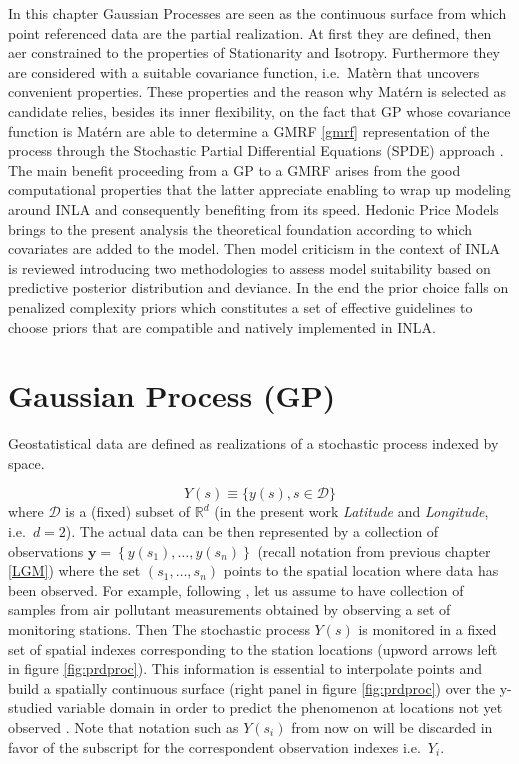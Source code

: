 \documentclass[
  12pt,
  a4paper,
  oneside]{book}
\theoremstyle{definition}
\theoremstyle{definition}
\theoremstyle{definition}
\theoremstyle{remark}
\begin{document}
In this chapter Gaussian Processes are seen as the continuous surface from which point referenced data are the partial realization. At first they are defined, then aer constrained to the properties of Stationarity and Isotropy. Furthermore they are considered with a suitable covariance function, i.e.~Matèrn that uncovers convenient properties. These properties and the reason why Matérn is selected as candidate relies, besides its inner flexibility, on the fact that GP whose covariance function is Matérn are able to determine a GMRF \ref{gmrf} representation of the process through the Stochastic Partial Differential Equations (SPDE) approach \citep{Lindgren2011}. The main benefit proceeding from a GP to a GMRF arises from the good computational properties that the latter appreciate enabling to wrap up modeling around INLA and consequently benefiting from its speed. Hedonic Price Models brings to the present analysis the theoretical foundation according to which covariates are added to the model. Then model criticism in the context of INLA is reviewed introducing two methodologies to assess model suitability based on predictive posterior distribution and deviance. In the end the prior choice falls on penalized complexity priors \citep{simpson2017} which constitutes a set of effective guidelines to choose priors that are compatible and natively implemented in INLA.

\hypertarget{GP}{%
\section{Gaussian Process (GP)}\label{GP}}

Geostatistical data are defined as realizations of a stochastic process indexed by space.

\[
Y(s) \equiv\{y(s), s \in \mathscr{D}\}
\]
where \(\mathscr{D}\) is a (fixed) subset of \(\mathbb{R}^{d}\) (in the present work \emph{Latitude} and \emph{Longitude}, i.e.~\(d=2\)).
The actual data can be then represented by a collection of observations \(\boldsymbol{\mathbf{y}}=\left\{y\left(s_{1}\right), \ldots, y\left(s_{n}\right)\right\}\) (recall notation from previous chapter \ref{LGM}) where the set \(\left(s_{1}, \ldots, s_{n}\right)\) points to the spatial location where data has been observed. For example, following \citet{Cameletti2012}, let us assume to have collection of samples from air pollutant measurements obtained by observing a set of monitoring stations. Then The stochastic process \(Y(s)\) is monitored in a fixed set of spatial indexes corresponding to the station locations (upword arrows left in figure \ref{fig:prdproc}). This information is essential to interpolate points and build a spatially continuous surface (right panel in figure \ref{fig:prdproc}) over the y-studied variable domain in order to predict the phenomenon at locations not yet observed \citep{LecturePaci}. Note that notation such as \(Y(s_i)\) from now on will be discarded in favor of the subscript for the correspondent observation indexes i.e.~\(Y_i\).
\end{document}
